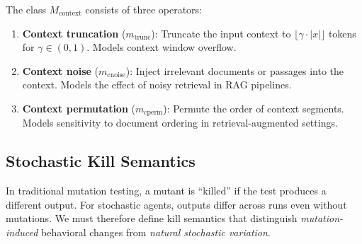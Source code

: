 \begin{definition}
\label{def:context-mutations}
The class $M_{\text{context}}$ consists of three operators:
\begin{enumerate}[leftmargin=*]
  \item \textbf{Context truncation} ($m_{\text{trunc}}$): Truncate the
    input context to $\lfloor \gamma \cdot |x| \rfloor$ tokens for
    $\gamma \in (0, 1)$. Models context window overflow.

  \item \textbf{Context noise} ($m_{\text{cnoise}}$): Inject irrelevant
    documents or passages into the context. Models the effect of noisy
    retrieval in RAG pipelines.

  \item \textbf{Context permutation} ($m_{\text{cperm}}$): Permute the
    order of context segments. Models sensitivity to document ordering
    in retrieval-augmented settings.
\end{enumerate}
\end{definition}

\subsection{Stochastic Kill Semantics}
\label{sec:mutation:kill}

In traditional mutation testing, a mutant is ``killed'' if the test
produces a different output. For stochastic agents, outputs differ across
runs even without mutations. We must therefore define kill semantics that
distinguish \emph{mutation-induced} behavioral changes from
\emph{natural stochastic variation}.


